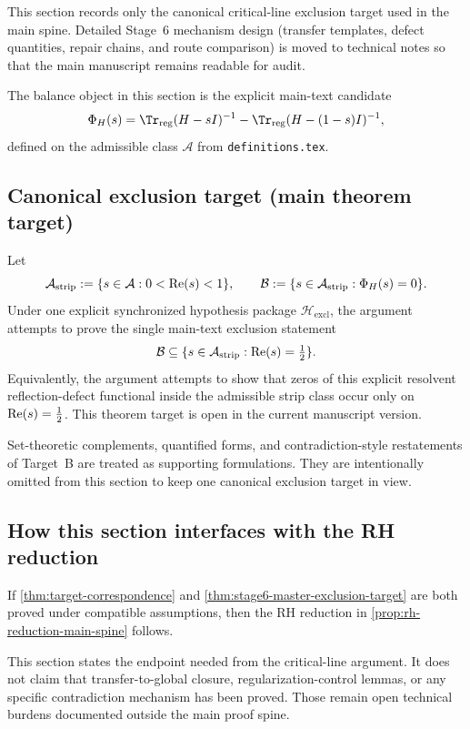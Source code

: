 This section records only the canonical critical-line exclusion target used in the main spine.
Detailed Stage~6 mechanism design (transfer templates, defect quantities, repair chains, and route comparison) is moved to technical notes so that the main manuscript remains readable for audit.

The balance object in this section is the explicit main-text candidate
\[
\Phi_H(s)=\Tr_{\mathrm{reg}}(H-sI)^{-1}-\Tr_{\mathrm{reg}}(H-(1-s)I)^{-1},
\]
defined on the admissible class $\mathcal{A}$ from \texttt{definitions.tex}.

\subsection*{Canonical exclusion target (main theorem target)}
\begin{drafttheorem}
\label{thm:stage6-master-exclusion-target}
Let
\[
\mathcal{A}_{\mathrm{strip}}:=\{s\in\mathcal{A}:0<\operatorname{Re}(s)<1\},
\qquad
\mathcal{B}:=\{s\in\mathcal{A}_{\mathrm{strip}}:\Phi_H(s)=0\}.
\]
Under one explicit synchronized hypothesis package $\mathcal{H}_{\mathrm{excl}}$, the argument attempts to prove the single main-text exclusion statement
\[
\mathcal{B}\subseteq\{s\in\mathcal{A}_{\mathrm{strip}}:\operatorname{Re}(s)=\tfrac12\}.
\]
Equivalently, the argument attempts to show that zeros of this explicit resolvent reflection-defect functional inside the admissible strip class occur only on $\operatorname{Re}(s)=\tfrac12$.
This theorem target is open in the current manuscript version.
\end{drafttheorem}

\begin{remark}
Set-theoretic complements, quantified forms, and contradiction-style restatements of Target~B are treated as supporting formulations.
They are intentionally omitted from this section to keep one canonical exclusion target in view.
\end{remark}

\subsection*{How this section interfaces with the RH reduction}
\begin{proposition}
If \cref{thm:target-correspondence} and \cref{thm:stage6-master-exclusion-target} are both proved under compatible assumptions, then the RH reduction in \cref{prop:rh-reduction-main-spine} follows.
\end{proposition}

\begin{remark}
This section states the endpoint needed from the critical-line argument.
It does not claim that transfer-to-global closure, regularization-control lemmas, or any specific contradiction mechanism has been proved.
Those remain open technical burdens documented outside the main proof spine.
\end{remark}
